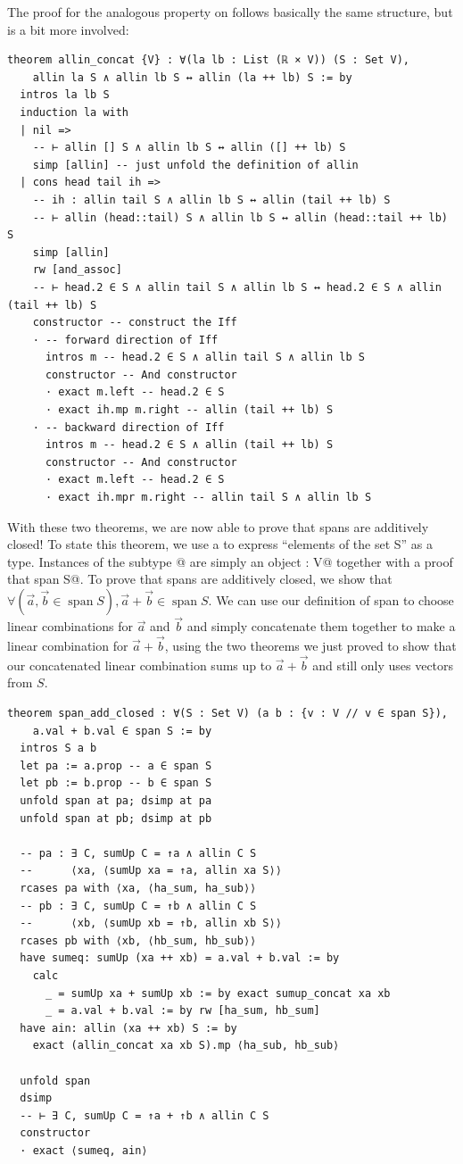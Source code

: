 \documentclass{article}
\DeclareMathOperator{\spann}{span}
\begin{document}
The proof for the analogous property on \lstinline@allin@ follows basically the same structure, but is a bit more involved:


\begin{lstlisting}
theorem allin_concat {V} : ∀(la lb : List (ℝ × V)) (S : Set V),
    allin la S ∧ allin lb S ↔ allin (la ++ lb) S := by
  intros la lb S
  induction la with
  | nil =>
    -- ⊢ allin [] S ∧ allin lb S ↔ allin ([] ++ lb) S
    simp [allin] -- just unfold the definition of allin
  | cons head tail ih =>
    -- ih : allin tail S ∧ allin lb S ↔ allin (tail ++ lb) S
    -- ⊢ allin (head::tail) S ∧ allin lb S ↔ allin (head::tail ++ lb) S
    simp [allin]
    rw [and_assoc]
    -- ⊢ head.2 ∈ S ∧ allin tail S ∧ allin lb S ↔ head.2 ∈ S ∧ allin (tail ++ lb) S
    constructor -- construct the Iff
    · -- forward direction of Iff
      intros m -- head.2 ∈ S ∧ allin tail S ∧ allin lb S
      constructor -- And constructor
      · exact m.left -- head.2 ∈ S
      · exact ih.mp m.right -- allin (tail ++ lb) S
    · -- backward direction of Iff
      intros m -- head.2 ∈ S ∧ allin (tail ++ lb) S
      constructor -- And constructor
      · exact m.left -- head.2 ∈ S
      · exact ih.mpr m.right -- allin tail S ∧ allin lb S
\end{lstlisting}

With these two theorems, we are now able to prove that spans are additively closed! To state this theorem, we use a \lstinline@Subtype@ to express ``elements of the set S'' as a type. Instances of the subtype @ are simply an object \lstinline@v : V@ together with a proof that \lstinline@v \in span S@. To prove that spans are additively closed, we show that $\forall(\vec a, \vec b\in \spann S), \vec a + \vec b \in \spann S$. We can use our definition of span to choose linear combinations for $\vec a$ and $\vec b$ and simply concatenate them together to make a linear combination for $\vec{a} + \vec{b}$, using the two theorems we just proved to show that our concatenated linear combination sums up to $\vec{a} + \vec{b}$ and still only uses vectors from $S$.

\begin{lstlisting}
theorem span_add_closed : ∀(S : Set V) (a b : {v : V // v ∈ span S}),
    a.val + b.val ∈ span S := by
  intros S a b
  let pa := a.prop -- a ∈ span S
  let pb := b.prop -- b ∈ span S
  unfold span at pa; dsimp at pa
  unfold span at pb; dsimp at pb

  -- pa : ∃ C, sumUp C = ↑a ∧ allin C S
  --      ⟨xa, ⟨sumUp xa = ↑a, allin xa S⟩⟩
  rcases pa with ⟨xa, ⟨ha_sum, ha_sub⟩⟩
  -- pb : ∃ C, sumUp C = ↑b ∧ allin C S
  --      ⟨xb, ⟨sumUp xb = ↑b, allin xb S⟩⟩
  rcases pb with ⟨xb, ⟨hb_sum, hb_sub⟩⟩
  have sumeq: sumUp (xa ++ xb) = a.val + b.val := by
    calc
      _ = sumUp xa + sumUp xb := by exact sumup_concat xa xb
      _ = a.val + b.val := by rw [ha_sum, hb_sum]
  have ain: allin (xa ++ xb) S := by
    exact (allin_concat xa xb S).mp ⟨ha_sub, hb_sub⟩

  unfold span
  dsimp
  -- ⊢ ∃ C, sumUp C = ↑a + ↑b ∧ allin C S
  constructor
  · exact ⟨sumeq, ain⟩
\end{lstlisting}
\end{document}
